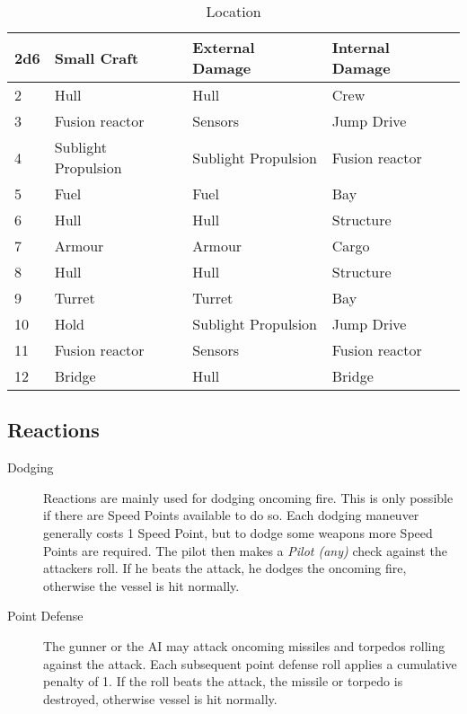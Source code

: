 \begin{table}[H]
  \centering
  \caption{Location}
  \label{tab:vessel-location}
  \begin{tabular}{|l|l|l|l|}
    \hline
    \textbf{2d6} & \textbf{Small Craft} & \textbf{External Damage} & \textbf{Internal Damage} \\ \hline
    2   & Hull                & Hull                & Crew            \\ \hline
    3   & Fusion reactor      & Sensors             & Jump Drive      \\ \hline
    4   & Sublight Propulsion & Sublight Propulsion & Fusion reactor  \\ \hline
    5   & Fuel                & Fuel                & Bay             \\ \hline
    6   & Hull                & Hull                & Structure       \\ \hline
    7   & Armour              & Armour              & Cargo           \\ \hline
    8   & Hull                & Hull                & Structure       \\ \hline
    9   & Turret              & Turret              & Bay             \\ \hline
    10  & Hold                & Sublight Propulsion & Jump Drive      \\ \hline
    11  & Fusion reactor      & Sensors             & Fusion reactor  \\ \hline
    12  & Bridge              & Hull                & Bridge          \\ \hline
  \end{tabular}
\end{table}

\subsection{Reactions}
\label{sub:Reactions}

\begin{description}
  \item[Dodging]
  Reactions are mainly used for dodging oncoming fire. This is only possible if there are Speed Points available to do so. Each dodging maneuver generally costs 1 Speed Point, but to dodge some weapons more Speed Points are required. The pilot then makes a \emph{Pilot (any)} check against the attackers roll. If he beats the attack, he dodges the oncoming fire, otherwise the vessel is hit normally.
  \item[Point Defense]
  The gunner or the AI may attack oncoming missiles and torpedos rolling against the attack. Each subsequent point defense roll applies a cumulative penalty of 1. If the roll beats the attack, the missile or torpedo is destroyed, otherwise vessel is hit normally.
\end{description}
